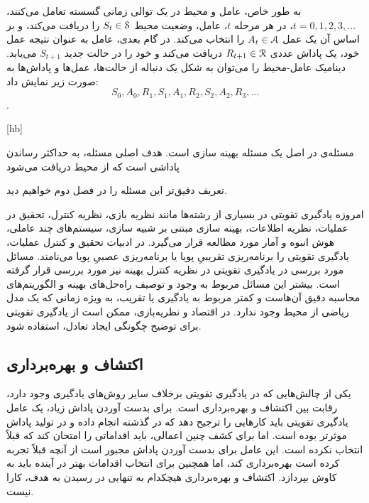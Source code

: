 به طور خاص، عامل و محیط در یک توالی زمانی گسسته تعامل می‌کنند، 
$t = 0,1,2,3,...$،
در هر مرحله $t$، عامل، وضعیت محیط  
$S_t \in \EuScript{S}$
را دریافت می‌کند، و بر اساس آن یک عمل 
$A_t \in \EuScript{A}$
را انتخاب می‌کند. در گام بعدی، عامل به عنوان نتیجه عمل خود، یک پاداش عددی $R_{t+1} \in \EuScript{R}$ دریافت می‌کند و خود را در حالت جدید $S_{t+1}$ می‌یابد.
دینامیک عامل-محیط را می‌توان به شکل یک دنباله از حالت‌ها، عمل‌ها و پاداش‌ها به صورت زیر نمایش داد:
$$S_0, A_0, R_1, S_1, A_1, R_2, S_2, A_2, R_3, ...$$.

[hb]




مسئله‌ی  در اصل یک مسئله بهینه سازی است. هدف اصلی مسئله، به حداکثر رساندن پاداشی است که از محیط دریافت می‌شود

تعریف دقیق‌تر این مسئله را در فصل دوم خواهیم دید.

امروزه یادگیری تقویتی
در بسیاری از رشته‌ها مانند نظریه بازی، نظریه کنترل، تحقیق در عملیات، نظریه اطلاعات، بهینه سازی مبتنی بر شبیه سازی، سیستم‌های چند عاملی، هوش انبوه و آمار مورد مطالعه قرار می‌گیرد. در ادبیات تحقیق و کنترل عملیات، یادگیری تقویتی را برنامه‌ریزی تقریبیِ پویا   یا برنامه‌ریزی عصبیِ پویا   می‌نامند. مسائل مورد بررسی در یادگیری تقویتی در نظریه کنترل بهینه  نیز مورد بررسی قرار گرفته است. بیشتر این مسائل مربوط به وجود و توصیف راه‌حل‌های بهینه و الگوریتم‌های محاسبه دقیق آن‌هاست و کمتر مربوط به یادگیری یا تقریب، به ویژه زمانی که یک مدل ریاضی از محیط وجود ندارد. در اقتصاد و نظریه‌بازی، ممکن است از یادگیری تقویتی برای توضیح چگونگی ایجاد تعادل، استفاده شود.


\subsection*{اکتشاف و بهره‌برداری}
یکی از چالش‌هایی که در یادگیری تقویتی برخلاف سایر روش‌های یادگیری وجود دارد، رقابت بین اکتشاف و بهره‌برداری است. برای بدست آوردن پاداش زیاد، یک عامل یادگیری تقویتی باید کارهایی را ترجیح دهد که در گذشته انجام داده و در تولید پاداش موثرتر بوده است. اما برای کشف چنین اعمالی، باید اقداماتی را امتحان کند که قبلاً انتخاب نکرده است. این عامل برای بدست آوردن پاداش مجبور است از آنچه قبلاً تجربه کرده است بهره‌برداری کند، اما همچنین برای انتخاب اقدامات بهتر در آینده باید به کاوش بپردازد. 
اکتشاف و بهره‌برداری هیچکدام به تنهایی در رسیدن به هدف، کارا نیست.
